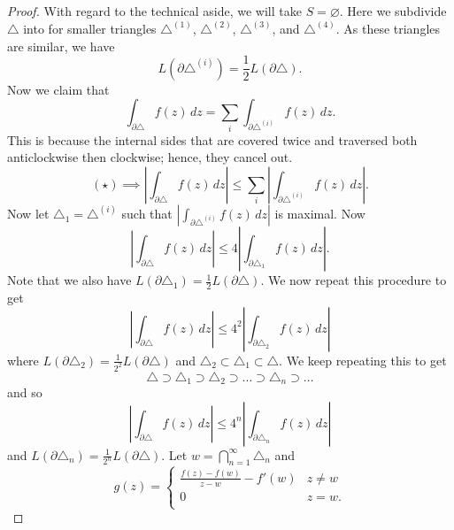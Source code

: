 \begin{proof}
    With regard to the technical aside, we will take 
    $S = \varnothing$.
    Here we subdivide $\triangle$ into for smaller triangles
    $\triangle^{(1)}$, $\triangle^{(2)}$, $\triangle^{(3)}$, and $\triangle^{(4)}$.
    As these triangles are similar, we have
    \[
        L\left(\partial \triangle^{(i)}\right) = \frac12 L(\partial \triangle).
    \]
    Now we claim that
    \[
        \int_{\partial \triangle} f(z) \, dz
        = \sum_{i} \int_{\partial \triangle^{(i)}} f(z) \,dz \tag{$\star$}.
    \]
    This is because the internal sides that are covered twice and
    traversed both anticlockwise then clockwise; hence,
    they cancel out.
    \[
        (\star) \implies 
        \left\lvert 
        \int_{\partial \triangle} f(z) \,dz 
        \right\rvert
        \leq \sum_{i} 
        \left\lvert 
            \int_{\partial \triangle^{(i)}} f(z) \,dz 
        \right\rvert
        .
    \]
    Now let $\triangle_1 = \triangle^{(i)}$ such that
    $\left\lvert \int_{\partial \triangle^{(i)}} f(z) \,dz \right\rvert$
    is maximal.
    Now
    \[
        \left\lvert
            \int_{\partial \triangle} f(z) \,dz
        \right\rvert
        \leq 4
        \left\lvert
            \int_{\partial \triangle_1} f(z) \,dz
        \right\rvert
        .
    \]
    Note that we also have $L(\partial \triangle_1) = \frac12 L(\partial\triangle)$.
    We now repeat this procedure to get
    \[
        \left\lvert
            \int_{\partial \triangle} f(z) \,dz
        \right\rvert
        \leq 4^2
        \left\lvert
            \int_{\partial \triangle_2} f(z) \,dz
        \right\rvert
    \]
    where $L(\partial \triangle_2) = \frac1{2^2} L(\partial\triangle)$
    and $\triangle_2 \subset \triangle_1 \subset \triangle$.
    We keep repeating this to get
    \[
        \triangle \supset \triangle_1 \supset \triangle_2 \supset \ldots
        \supset \triangle_n \supset \ldots
    \]
    and so
    \[
        \left\lvert 
            \int_{\partial\triangle} f(z) \,dz
        \right\rvert
        \leq
        4^n
        \left\lvert
            \int_{\partial \triangle_n} f(z) \,dz
        \right\rvert
    \]
    and $L(\partial \triangle_n) = \frac1{2^n} L(\partial \triangle)$.
    Let $w = \bigcap_{n = 1}^\infty \triangle_n$ and
    \[
        g(z) =
        \begin{cases}
            \frac{f(z) - f(w)}{z - w} - f'(w) & z \neq w \\
            0 & z = w. \\
        \end{cases}
\]
\end{proof}
